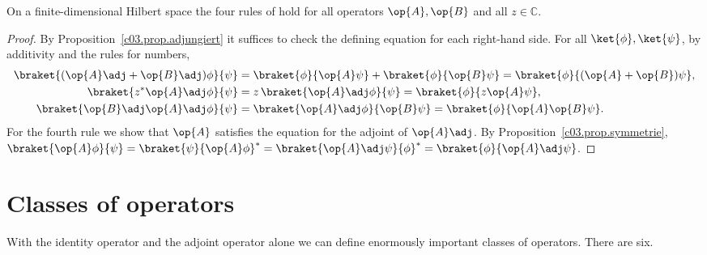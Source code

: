 \begin{proposition}\label{c03.prop.adj-regeln}
  On a finite-dimensional Hilbert space the four rules of  hold for all operators
  $\op{A}, \op{B}$ and all $z \in \mathbb{C}$.
\end{proposition}
\begin{proof}
  By Proposition~\ref{c03.prop.adjungiert} it suffices to check the defining equation for each
  right-hand side. For all $\ket{\phi}, \ket{\psi}$, by additivity and the rules for numbers,
  \begin{equation}\label{c03.eq.adj-regeln}
    \begin{aligned}
      \braket{(\op{A}\adj + \op{B}\adj)\phi}{\psi}
        &= \braket{\phi}{\op{A}\psi} + \braket{\phi}{\op{B}\psi}
         = \braket{\phi}{(\op{A} + \op{B})\psi} , \\
      \braket{z^* \op{A}\adj\phi}{\psi}
        &= z\, \braket{\op{A}\adj\phi}{\psi}
         = \braket{\phi}{z\op{A}\psi} , \\
      \braket{\op{B}\adj\op{A}\adj\phi}{\psi}
        &= \braket{\op{A}\adj\phi}{\op{B}\psi}
         = \braket{\phi}{\op{A}\op{B}\psi} .
    \end{aligned}
  \end{equation}
  For the fourth rule we show that $\op{A}$ satisfies the equation for the adjoint of
  $\op{A}\adj$. By Proposition~\ref{c03.prop.symmetrie},
  $\braket{\op{A}\phi}{\psi} = \braket{\psi}{\op{A}\phi}^* = \braket{\op{A}\adj\psi}{\phi}^* = \braket{\phi}{\op{A}\adj\psi}$.
\end{proof}

\section{Classes of operators}\label{c03.s10}

With the identity operator and the adjoint operator alone we can define enormously important
classes of operators. There are six.







